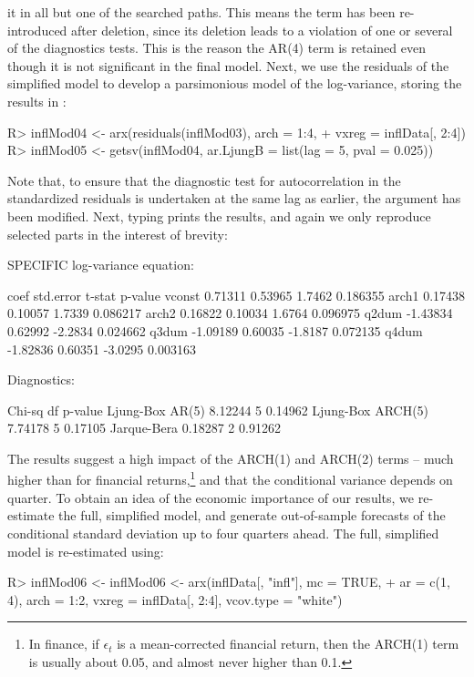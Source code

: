 \documentclass[article,nojss]{jss}
\begin{document}
it in all but one of the searched paths. This means the term has been
re-introduced after deletion, since its deletion leads to a violation
of one or several of the diagnostics tests. This is the reason the
AR(4) term is retained even though it is not significant in the final
model. Next, we use the residuals of the simplified model to develop a
parsimonious model of the log-variance, storing the results in
:
%
\begin{CodeChunk}
\begin{CodeInput}
R> inflMod04 <- arx(residuals(inflMod03), arch = 1:4,
+    vxreg = inflData[, 2:4])
R> inflMod05 <- getsv(inflMod04, ar.LjungB = list(lag = 5, pval = 0.025))
\end{CodeInput}
\end{CodeChunk}
%
Note that, to ensure that the diagnostic test for autocorrelation in the standardized residuals is undertaken at the same lag as earlier, the  argument has been modified. Next, typing  prints the results, and again we only reproduce selected parts in the interest of brevity:
%
\begin{CodeChunk}
\begin{CodeOutput}
SPECIFIC log-variance equation:

           coef std.error  t-stat  p-value
vconst  0.71311   0.53965  1.7462 0.186355
arch1   0.17438   0.10057  1.7339 0.086217
arch2   0.16822   0.10034  1.6764 0.096975
q2dum  -1.43834   0.62992 -2.2834 0.024662
q3dum  -1.09189   0.60035 -1.8187 0.072135
q4dum  -1.82836   0.60351 -3.0295 0.003163

Diagnostics:

                   Chi-sq df p-value
Ljung-Box AR(5)   8.12244  5 0.14962
Ljung-Box ARCH(5) 7.74178  5 0.17105
Jarque-Bera       0.18287  2 0.91262
\end{CodeOutput}
\end{CodeChunk}
%
The results suggest a high impact of the ARCH(1) and ARCH(2) terms --
much higher than for financial returns,\footnote{In finance, if
  $\epsilon_t$ is a mean-corrected financial return, then the ARCH(1)
  term is usually about 0.05, and almost never higher than 0.1.} and
that the conditional variance depends on quarter. To obtain an idea of
the economic importance of our results, we re-estimate the full,
simplified model, and generate out-of-sample forecasts of the
conditional standard deviation up to four quarters ahead. The full,
simplified model is re-estimated using:
%
\begin{CodeChunk}
\begin{CodeInput}
R> inflMod06 <- inflMod06 <- arx(inflData[, "infl"], mc = TRUE, 
+    ar = c(1, 4), arch = 1:2, vxreg = inflData[, 2:4], vcov.type = "white")
\end{CodeInput}
\end{CodeChunk}
\end{document}
